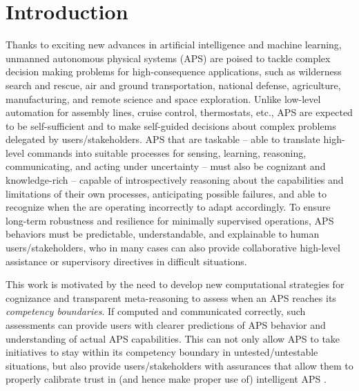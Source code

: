 \section{Introduction}

Thanks to exciting new advances in artificial intelligence and machine learning, unmanned autonomous physical systems (APS) are poised to tackle complex decision making problems for high-consequence applications, such as wilderness search and rescue, air and ground transportation, national defense, agriculture, manufacturing, and remote science and space exploration. 
Unlike low-level automation for assembly lines, cruise control, thermostats, etc., APS are expected to be self-sufficient and to make self-guided decisions about complex problems delegated by users/stakeholders. APS that are taskable -- able to translate high-level commands into suitable processes for sensing, learning, reasoning, communicating, and acting under uncertainty -- must also be cognizant and knowledge-rich -- capable of introspectively reasoning about the capabilities and limitations of their own processes, anticipating possible failures, and able to recognize when the are operating incorrectly to adapt accordingly. To ensure long-term robustness and resilience for minimally supervised operations, APS behaviors must be predictable, understandable, and explainable to human users/stakeholders, who in many cases can also provide collaborative high-level assistance or supervisory directives in difficult situations. 

This work is motivated by the need to develop new computational strategies for cognizance and transparent meta-reasoning to assess when an APS reaches its \emph{competency boundaries}. If computed and communicated correctly, such assessments can provide users with clearer predictions of APS behavior and understanding of actual APS capabilities. This can not only allow APS to take initiatives to stay within its competency boundary in untested/untestable situations, but also provide users/stakeholders with assurances that allow them to properly calibrate trust in (and hence make proper use of) intelligent APS \cite{Israelsen2018-es}. 


